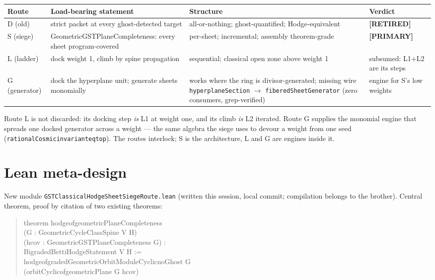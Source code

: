 \documentclass[11pt]{article}
\renewcommand{\_}{\textunderscore\allowbreak}
\newcommand{\status}[1]{\textbf{[#1]}}
\begin{document}
{\small
\begin{tabularx}{\textwidth}{@{}p{} X p{} p{}@{}}
\toprule
\textbf{Route} & \textbf{Load-bearing statement} & \textbf{Structure} & \textbf{Verdict} \\
\midrule
D (old) &
strict packet at every ghost-detected target &
all-or-nothing; ghost-quantified; Hodge-equivalent &
\status{RETIRED} \\
\addlinespace
S (siege) &
GeometricGSTPlaneCompleteness: every sheet program-covered &
per-sheet; incremental; assembly theorem-grade &
\status{PRIMARY} \\
\addlinespace
L (ladder) &
dock weight 1, climb by spine propagation &
sequential; classical open zone above weight 1 &
subsumed: L1$+$L2 are its steps \\
\addlinespace
G (generator) &
dock the hyperplane unit; generate sheets monomially &
works where the ring is divisor-generated; missing wire
\newline \texttt{hyperplaneSection} $\to$ \texttt{fiberedSheetGenerator}
\newline (zero consumers, grep-verified) &
engine for S's low weights \\
\bottomrule
\end{tabularx}}

\medskip
\noindent Route L is not discarded: its docking step \emph{is} L1 at weight one,
and its climb \emph{is} L2 iterated. Route G supplies the monomial engine that
spreads one docked generator across a weight --- the same algebra the siege
uses to devour a weight from one seed
(\texttt{rationalCosmic\_invariant\_eq\_top}). The routes interlock; S is the
architecture, L and G are engines inside it.

\section{Lean meta-design}\label{sec:lean}

New module \texttt{GSTClassicalHodgeSheetSiegeRoute.lean} (written this
session, local commit; compilation belongs to the brother). Central theorem,
proof by citation of two existing theorems:

\begin{quote}\small\ttfamily
theorem hodge\_of\_geometricPlaneCompleteness\\
\phantom{~~~~}(G : GeometricCycleClassSpine V H)\\
\phantom{~~~~}(hcov : GeometricGSTPlaneCompleteness G) :\\
\phantom{~~~~}BigradedBettiHodgeStatement V H :=\\
\phantom{~~}hodge\_of\_gradedGeometricOrbitModuleCyclic\_noGhost G\\
\phantom{~~~~}(orbitCyclic\_of\_geometricPlane G hcov)
\end{quote}
\end{document}
